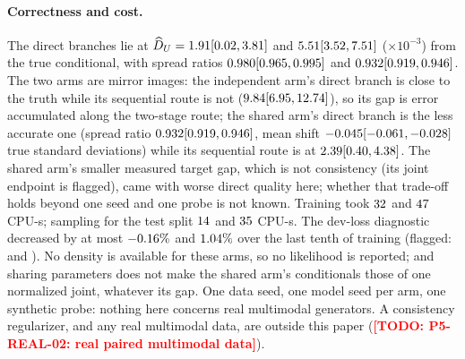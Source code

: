 \documentclass{article}
\theoremstyle{plain}
\theoremstyle{definition}
\theoremstyle{remark}
\newcommand{\todo}[1]{\textcolor{red}{\textbf{[TODO: #1]}}}
\begin{document}
\paragraph{Correctness and cost.}
The direct branches lie at $\widehat D_U=1.91 [0.02, 3.81]$ and $5.51 [3.52, 7.51]$ ($\times10^{-3}$) from the true conditional, with spread ratios $0.980 [0.965, 0.995]$ and $0.932 [0.919, 0.946]$.
The two arms are mirror images: the independent arm's direct branch is close to the truth while its sequential route is not ($9.84 [6.95, 12.74]$), so its gap is error accumulated along the two-stage route; the shared arm's direct branch is the less accurate one (spread ratio $0.932 [0.919, 0.946]$, mean shift $-0.045 [-0.061, -0.028]$ true standard deviations) while its sequential route is at $2.39 [0.40, 4.38]$. The shared arm's smaller measured target gap, which is not consistency (its joint endpoint is flagged), came with worse direct quality here; whether that trade-off holds beyond one seed and one probe is not known.
Training took $32$ and $47$ CPU-s; sampling for the test split $14$ and $35$ CPU-s.
The dev-loss diagnostic decreased by at most $-0.16\%$ and $1.04\%$ over the last tenth of training (flagged: \numFmIndUnderFlag{} and \numFmShUnderFlag).
No density is available for these arms, so no likelihood is reported; and sharing parameters does not make the shared arm's conditionals those of one normalized joint, whatever its gap.
One data seed, one model seed per arm, one synthetic probe: nothing here concerns real multimodal generators.
A consistency regularizer, and any real multimodal data, are outside this paper (\todo{P5-REAL-02: real paired multimodal data}).
\end{document}
